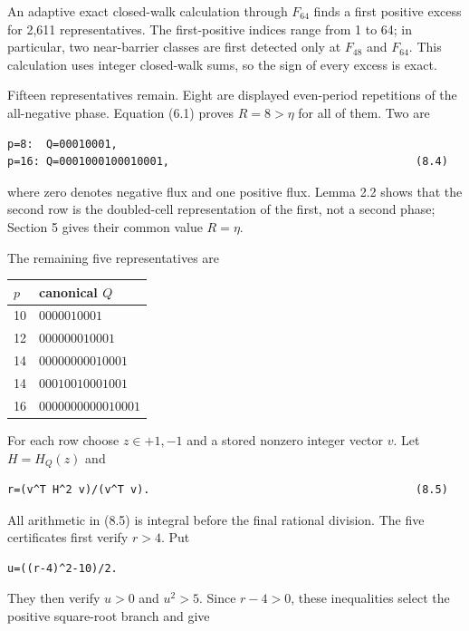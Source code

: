 An adaptive exact closed-walk calculation through \(F_64\) finds a first
positive excess for 2,611 representatives. The first-positive indices range
from 1 to 64; in particular, two near-barrier classes are first detected only
at \(F_48\) and \(F_64\). This calculation uses integer closed-walk sums, so the
sign of every excess is exact.

Fifteen representatives remain. Eight are displayed even-period repetitions
of the all-negative phase. Equation (6.1) proves \(R=8>\eta\) for all of them.
Two are

\begin{lstlisting}[language={}]
p=8:  Q=00010001,
p=16: Q=0001000100010001,                                      (8.4)
\end{lstlisting}

where zero denotes negative flux and one positive flux. Lemma 2.2 shows that
the second row is the doubled-cell representation of the first, not a second
phase; Section 5 gives their common value \(R=\eta\).

The remaining five representatives are

\begin{center}
\begin{tabular}{ll}
\toprule
\(p\) & canonical \(Q\) \\
\midrule
10 & \(0000010001\) \\
12 & \(000000010001\) \\
14 & \(00000000010001\) \\
14 & \(00010010001001\) \\
16 & \(0000000000010001\) \\
\bottomrule
\end{tabular}%
\end{center}

For each row choose \(z \in {+1,-1}\) and a stored nonzero integer vector \(v\).
Let \(H=H_Q(z)\) and

\begin{lstlisting}[language={}]
r=(v^T H^2 v)/(v^T v).                                         (8.5)
\end{lstlisting}

All arithmetic in (8.5) is integral before the final rational division. The
five certificates first verify \(r>4\). Put

\begin{lstlisting}[language={}]
u=((r-4)^2-10)/2.
\end{lstlisting}

They then verify \(u>0\) and \(u^2>5\). Since \(r-4>0\), these inequalities select
the positive square-root branch and give

